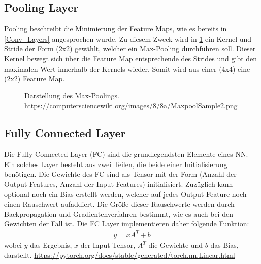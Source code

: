 \subsection{Pooling Layer} \label{Pooling_Layer}
Pooling beschreibt die Minimierung der Feature Maps, wie es bereits in \ref{Conv_Layers} angesprochen wurde. Zu diesem Zweck wird in \ref{fig:Maxpool} ein Kernel und Stride der Form (2x2) gewählt, welcher ein Max-Pooling durchführen soll. Dieser Kernel bewegt sich über die Feature Map entsprechende des Strides und gibt den maximalen Wert innerhalb der Kernels wieder. Somit wird aus einer (4x4) eine (2x2) Feature Map. \cite[S. 379 ff.]{DL}

\begin{figure}[H]
	\centering
	\def\svgscale{1.70}
	
	\caption[Darstellung MaxPooling]{Darstellung des Max-Poolings. \url{https://computersciencewiki.org/images/8/8a/MaxpoolSample2.png}}
	\label{fig:Maxpool}
\end{figure}

\subsection{Fully Connected Layer} \label{FC_Layers}
Die Fully Connected Layer (FC) sind die grundlegendsten Elemente eines NN. Ein solches Layer besteht aus zwei Teilen, die beide einer Initialisierung benötigen.
Die Gewichte des FC sind als Tensor mit der Form (Anzahl der Output Features, Anzahl der Input Features) initialisiert. Zuzüglich kann optional noch ein Bias erstellt werden, welcher auf jedes Output Feature noch einen Rauschwert aufaddiert. Die Größe dieser Rauschwerte werden durch Backpropagation und Gradientenverfahren bestimmt, wie es auch bei den Gewichten der Fall ist. Die FC Layer implementieren daher folgende Funktion:
\begin{align}
	y = xA^T + b
\end{align}
wobei $y$ das Ergebnis, $x$ der Input Tensor, $A^T$ die Gewichte und $b$ das Bias, darstellt. \url{https://pytorch.org/docs/stable/generated/torch.nn.Linear.html}


